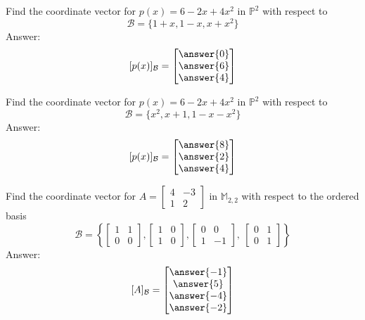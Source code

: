 \documentclass{ximera}
\begin{document}
\begin{problem}\label{prob:coordvectors1}
Find the coordinate vector for $p(x)=6-2x+4x^2$ in $\mathbb{P}^2$ with respect to 
$$\mathcal{B}=\{1 + x, 1 - x, x + x^{2}\}$$
Answer:
$$[p(x)]_{\mathcal{B}}=\begin{bmatrix}\answer{0}\\\answer{6}\\\answer{4}\end{bmatrix}$$
\end{problem}

\begin{problem}\label{prob:coordvectors2}
Find the coordinate vector for $p(x)=6-2x+4x^2$ in $\mathbb{P}^2$ with respect to 
$$\mathcal{B}=\{x^{2}, x + 1, 1 - x - x^{2}\}$$
Answer:
$$[p(x)]_{\mathcal{B}}=\begin{bmatrix}\answer{8}\\\answer{2}\\\answer{4}\end{bmatrix}$$
\end{problem}

\begin{problem}\label{prob:coordvectors3}
Find the coordinate vector for $A=\begin{bmatrix}4&-3\\1&2\end{bmatrix}$ in $\mathbb{M}_{2,2}$ with respect to the ordered basis
$$\mathcal{B}=
\left\{
\begin{bmatrix}
1 & 1 \\
0 & 0
\end{bmatrix}
, 
\begin{bmatrix}
1 & 0 \\
1 & 0
\end{bmatrix}
, 
\begin{bmatrix}
0 & 0 \\
1 & -1
\end{bmatrix}
,\
\begin{bmatrix}
0 & 1 \\
0 & 1
\end{bmatrix}
\right\}$$ 
Answer:
$$[A]_{\mathcal{B}}=\begin{bmatrix}\answer{-1}\\\answer{5}\\\answer{-4}\\\answer{-2}\end{bmatrix}$$
\end{problem}

\end{document}
